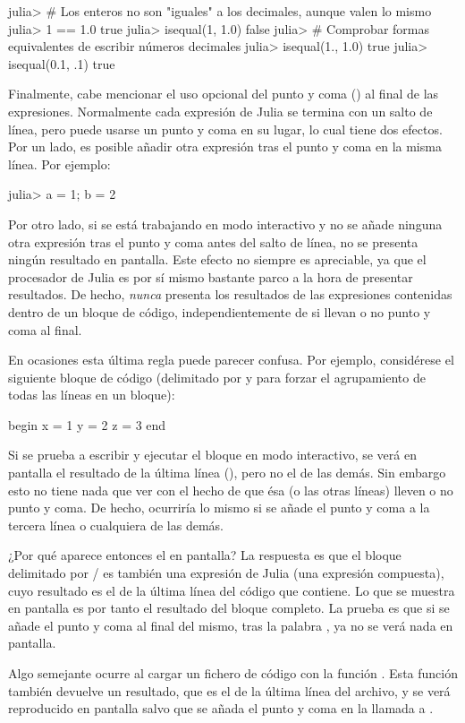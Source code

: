 ﻿\documentclass[spanish]{article}
\begin{document}
julia> # Los enteros no son "iguales" a los decimales, aunque valen lo mismo
julia> 1 == 1.0
true
julia> isequal(1, 1.0)
false
julia> # Comprobar formas equivalentes de escribir números decimales
julia> isequal(1., 1.0)
true
julia> isequal(0.1, .1)
true

Finalmente, cabe mencionar el uso opcional del punto y coma (\code{;})
al final de las expresiones. Normalmente cada expresión de Julia se
termina con un salto de línea, pero puede usarse un punto y coma en
su lugar, lo cual tiene dos efectos. Por un lado, es posible añadir
otra expresión tras el punto y coma en la misma línea. Por ejemplo:

julia> a = 1; b = 2

Por otro lado, si se está trabajando en modo interactivo y
no se añade ninguna otra expresión tras el punto y coma
antes del salto de línea, no se presenta ningún resultado en pantalla.
Este efecto no siempre es apreciable, ya que el procesador de Julia
es por sí mismo bastante parco a la hora de presentar resultados.
De hecho, \emph{nunca} presenta los resultados de las expresiones
contenidas dentro de un bloque de código, independientemente de si
llevan o no punto y coma al final.

En ocasiones esta última regla puede parecer confusa. Por ejemplo,
considérese el siguiente bloque de código (delimitado por 
y  para forzar el agrupamiento de todas las líneas en un
bloque):

begin
  x = 1
  y = 2
  z = 3
end

Si se prueba a escribir y ejecutar el bloque en modo interactivo,
se verá en pantalla el resultado de la última línea (),
pero no el de las demás. Sin embargo esto no tiene nada que ver
con el hecho de que ésa (o las otras líneas) lleven o no punto y coma.
De hecho, ocurriría lo mismo si se añade el punto y coma a la tercera
línea o cualquiera de las demás.

¿Por qué aparece entonces el  en pantalla? La respuesta es
que el bloque delimitado por / es también
una expresión de Julia (una expresión compuesta), cuyo resultado
es el de la última línea del código que contiene. Lo que se muestra
en pantalla es por tanto el resultado del bloque completo.
La prueba es que si se añade el punto y coma al final del mismo,
tras la palabra , ya no se verá nada en pantalla.

Algo semejante ocurre al cargar un fichero de código con la
función . Esta función también devuelve un resultado,
que es el de la última línea del archivo, y se verá reproducido en
pantalla salvo que se añada el punto y coma en la llamada a .
\end{document}
